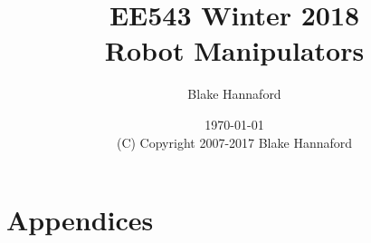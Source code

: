 \documentclass[oneside]{book}
\begin{document}
\setpagewiselinenumbers
\modulolinenumbers[5]

\setcounter{chapter}{0}



 \title{EE543  Winter 2018\\Robot Manipulators}

 \author{Blake Hannaford}

 \date{\today\\(C) Copyright 2007-2017 Blake Hannaford}

 \maketitle

\tableofcontents

\mainmatter

\linenumbers

 
%
%

\part{Appendices}
\appendix



%
\label{LastPage}
\end{document}
